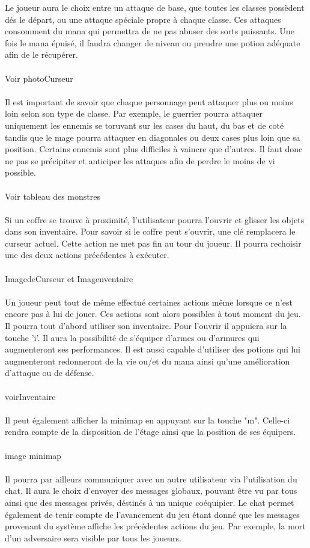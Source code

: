 \documentclass[a4paper, 12pt]{article}
\begin{document}
Le joueur aura le choix entre un attaque de base, que toutes les classes possèdent dés le départ, ou une attaque spéciale propre à chaque classe. Ces attaques consomment du mana qui permettra de ne pas abuser des sorts puissants. Une fois le mana épuisé, il faudra changer de niveau ou prendre une potion adéquate afin de le récupérer.
\\
\\
Voir photoCurseur
\\
\\
Il est important de savoir que chaque personnage peut attaquer plus ou moins loin selon son type de classe. Par exemple, le guerrier pourra attaquer uniquement les ennemis se toruvant sur les cases du haut, du bas et de coté tandis que le mage pourra attaquer en diagonales ou deux cases plus loin que sa position.
Certains ennemis sont plus difficiles à vaincre que d'autres. Il faut donc ne pas se précipiter et anticiper les attaques afin de perdre le moins de vi possible.
\\
\\
Voir tableau des monstres
\\
\\
Si un coffre se trouve à proximité, l'utilisateur pourra l'ouvrir et glisser les objets dans son inventaire. Pour savoir si le coffre peut s'ouvrir, une clé remplacera le curseur actuel. Cette action ne met pas fin au tour du joueur. Il pourra rechoisir une des deux actions précédentes à exécuter.
\\
\\
ImagedeCurseur et Imagenventaire
\\
\\
Un joueur peut tout de même effectué certaines actions même lorsque ce n'est encore pas à lui de jouer. Ces actions sont alors possibles à tout moment du jeu.
\\
Il pourra tout d'abord utiliser son inventaire. Pour l'ouvrir il appuiera sur la touche 'i'. Il aura la possibilité de s'équiper d'armes ou d'armures qui augmenteront ses performances. Il est aussi capable d'utiliser des potions qui lui augmenteront redonneront de la vie ou/et du mana ainsi qu'une amélioration d'attaque ou de défense. 
\\
\\
voirInventaire
\\
\\
Il peut également afficher la minimap en appuyant sur la touche "m". Celle-ci rendra compte de la disposition de l'étage ainsi que la position de ses équipers.
\\
\\
image minimap
\\
\\
Il pourra par ailleurs communiquer avec un autre utilisateur via l'utilisation du chat. Il aura le choix d'envoyer des messages globaux, pouvant être vu par tous ainsi que des messages privés, déstinés à un unique coéquipier. Le chat permet également de tenir compte de l'avancement du jeu étant donné que les messages provenant du système affiche les précédentes actions du jeu. Par exemple, la mort d'un adversaire sera visible par tous les joueurs.
\newpage
\end{document}
